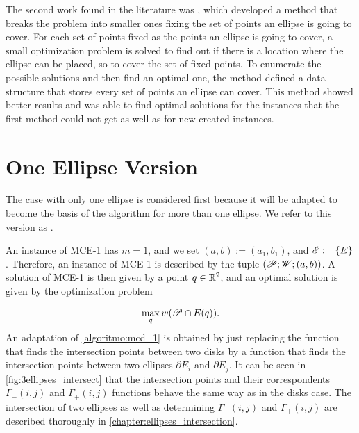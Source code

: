 The second work found in the literature was , which developed a method that breaks the problem into smaller ones fixing the set of points an ellipse is going to cover. For each set of points fixed as the points an ellipse is going to cover, a small optimization problem is solved to find out if there is a location where the ellipse can be placed, so to cover the set of fixed points. To enumerate the possible solutions and then find an optimal one, the method defined a data structure that stores every set of points an ellipse can cover. This method showed better results and was able to find optimal solutions for the instances that the first method could not get as well as for new created instances.

\section{One Ellipse Version}

The case with only one ellipse is considered first because it will be adapted to become the basis of the algorithm for more than one ellipse. We refer to this version as . 

An instance of MCE-1 has $m=1$, and we set $(a, b):=(a_1, b_1)$, and $\mathscr{E} := \{E\}$. Therefore, an instance of MCE-1 is described by the tuple $(\mathscr{P}; \mathscr{W}; (a, b))$. A solution of MCE-1 is then given by a point $q\in\mathbb{R}^2$, and an optimal solution is given by the optimization problem

\begin{equation}
\max_q w(\mathscr{P} \cap E(q)).
\end{equation}
An adaptation of \autoref{algoritmo:mcd_1} is obtained by just replacing the function that finds the intersection points between two disks by a function that finds the intersection points between two ellipses $\partial E_i$ and $\partial E_j$.
It can be seen in \autoref{fig:3ellipses_intersect} that the intersection points and their correspondents $\Gamma_-(i,j)$ and $\Gamma_+(i,j)$ functions behave the same way as in the disks case.
The intersection of two ellipses as well as determining $\Gamma_-(i,j)$ and $\Gamma_+(i,j)$ are described thoroughly in \autoref{chapter:ellipses_intersection}. 

